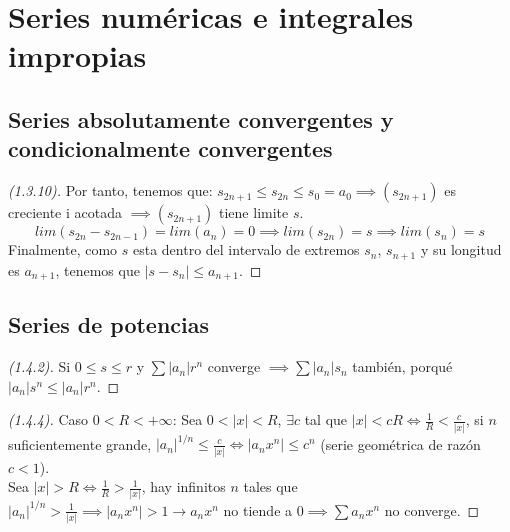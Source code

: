 \section{Series numéricas e integrales impropias}

\subsection{Series absolutamente convergentes y condicionalmente convergentes}

\begin{proof}[(1.3.10)]
    Por tanto, tenemos que: $s_{2n+1} \leq s_{2n} \leq s_0 = a_0
    \implies (s_{2n+1})$ es creciente i acotada $\implies
    (s_{2n+1})$ tiene limite $s$.
    \[
        lim(s_{2n}-s_{2n-1})=lim(a_n)=0 \implies lim(s_{2n}) = s
        \implies lim(s_n)=s
    \]
    Finalmente, como $s$ esta dentro del intervalo de extremos
    $s_n$, $s_{n+1}$ y su longitud es $a_{n+1}$, tenemos que $\mid
    s-s_n \mid \leq a_{n+1}$.
\end{proof}

\subsection{Series de potencias}

\begin{proof}[(1.4.2)]
    Si $0 \leq s \leq r$ y $\sum |a_n| r^n$ converge $\implies \sum
    |a_n|s_n$ también, porqué $|a_n|s^n \leq |a_n|r^n$.
\end{proof}

\begin{proof}[(1.4.4)]
    Caso $0 < R < + \infty$: Sea $0<|x|<R$, $\exists c$ tal que
    $|x|<cR \iff \frac{1}{R} < \frac{c}{|x|}$, si $n$
    suficientemente grande, $|a_n|^{1/n} \leq \frac{c}{|x|} \iff
    \mid a_nx^n \mid \leq c^n$ (serie geométrica de razón $c<1$). \\
    Sea $|x|>R \iff \frac{1}{R} > \frac{1}{|x|}$, hay infinitos $n$
    tales que $|a_n|^{1/n} > \frac{1}{|x|} \implies \mid a_nx^n \mid >1
    \rightarrow a_nx^n$ no tiende a $0 \implies \sum a_nx^n$ no converge.
\end{proof}
